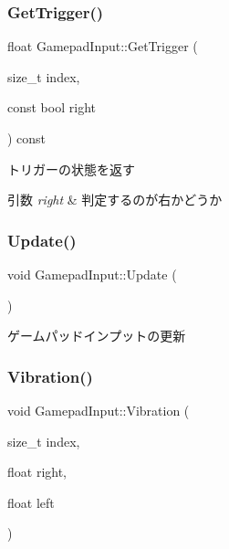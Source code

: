 \subsubsection{\texorpdfstring{Get\+Trigger()}{GetTrigger()}}
{\footnotesize\ttfamily float Gamepad\+Input\+::\+Get\+Trigger (\begin{DoxyParamCaption}\item[{size\+\_\+t}]{index,  }\item[{const bool}]{right }\end{DoxyParamCaption}) const\hspace{0.3cm}{\ttfamily [inline]}}



トリガーの状態を返す 


\begin{DoxyParams}{引数}
{\em right} & 判定するのが右かどうか \\
\hline
\end{DoxyParams}
\mbox{\label{class_gamepad_input_a3512c0cc4d57534c83db09c4b5377caa}} 
\subsubsection{\texorpdfstring{Update()}{Update()}}
{\footnotesize\ttfamily void Gamepad\+Input\+::\+Update (\begin{DoxyParamCaption}{ }\end{DoxyParamCaption})}



ゲームパッドインプットの更新 

\mbox{\label{class_gamepad_input_afd429d32d076130ff8a7df12037eaddd}} 
\subsubsection{\texorpdfstring{Vibration()}{Vibration()}}
{\footnotesize\ttfamily void Gamepad\+Input\+::\+Vibration (\begin{DoxyParamCaption}\item[{size\+\_\+t}]{index,  }\item[{float}]{right,  }\item[{float}]{left }\end{DoxyParamCaption})}



